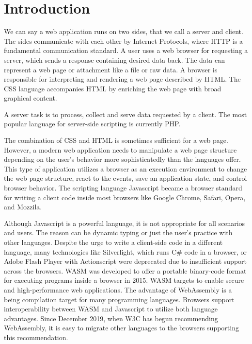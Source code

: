 \chapter{Introduction}

We can say a web application runs on two sides, that we call a server and client.
The sides communicate with each other by Internet Protocols, where
\ac{HTTP} is a fundamental communication standard.
A user uses a web browser for requesting a server, which sends a response containing desired data back.
The data can represent a web page or attachment like a file or raw data.
A browser is responsible for interpreting and rendering a web page described by \ac{HTML}.
The \ac{CSS} language accompanies HTML by enriching the web page with broad graphical content. 
\par
A server task is to process, collect and serve data requested by a client.
The most popular language for server-side scripting is currently PHP. 
\par
The combination of CSS and HTML is sometimes sufficient for a web page.
However, a modern web application needs to manipulate a web page structure depending on the user's behavior more sophisticatedly than the languages offer.
This type of application utilizes a browser as an execution environment to change the web page structure, react to the events, save an application state, and control browser behavior. 
The scripting language Javascript became a browser standard for writing a client code inside most browsers like Google Chrome, Safari, Opera, and Mozzila.
\par
Although Javascript is a powerful language, it is not appropriate for all scenarios and users.
The reason can be dynamic typing or just the user's practice with other languages.
Despite the urge to write a client-side code in a different language, many technologies like Silverlight, which runs C\# code in a browser, or Adobe Flash Player with Actionscript were deprecated due to insufficient support across the browsers.
\ac{WASM} \cite{online:wasmWiki} was developed to offer a portable binary-code format for executing programs inside a browser in 2015.
WASM targets to enable secure and high-performance web applications.
The advantage of WebAssembly is a being compilation target for many programming languages.
Browsers support interoperability between WASM and Javascript to utilize both language advantages.
Since December 2019, when \ac{W3C} has begun recommending WebAssembly, it is easy to migrate other languages to the browsers supporting this recommendation.
